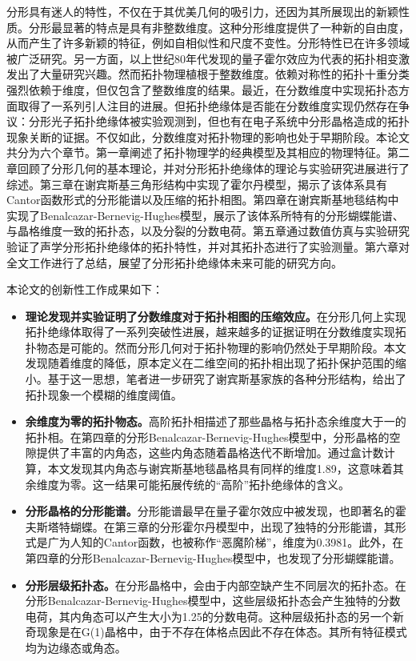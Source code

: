 \cleardoublepage
{}
分形具有迷人的特性，不仅在于其优美几何的吸引力，还因为其所展现出的新颖性质。分形最显著的特点是具有非整数维度。这种分形维度提供了一种新的自由度，从而产生了许多新颖的特征，例如自相似性和尺度不变性。分形特性已在许多领域被广泛研究。另一方面，以上世纪80年代发现的量子霍尔效应为代表的拓扑相变激发出了大量研究兴趣。然而拓扑物理植根于整数维度。依赖对称性的拓扑十重分类强烈依赖于维度，但仅包含了整数维度的结果。最近，在分数维度中实现拓扑态方面取得了一系列引人注目的进展。但拓扑绝缘体是否能在分数维度实现仍然存在争议：分形光子拓扑绝缘体被实验观测到，但也有在电子系统中分形晶格造成的拓扑现象关断的证据。不仅如此，分数维度对拓扑物理的影响也处于早期阶段。本论文共分为六个章节。第一章阐述了拓扑物理学的经典模型及其相应的物理特征。第二章回顾了分形几何的基本理论，并对分形拓扑绝缘体的理论与实验研究进展进行了综述。第三章在谢宾斯基三角形结构中实现了霍尔丹模型，揭示了该体系具有Cantor函数形式的分形能谱以及压缩的拓扑相图。第四章在谢宾斯基地毯结构中实现了Benalcazar-Bernevig-Hughes模型，展示了该体系所特有的分形蝴蝶能谱、与晶格维度一致的拓扑态，以及分裂的分数电荷。第五章通过数值仿真与实验研究验证了声学分形拓扑绝缘体的拓扑特性，并对其拓扑态进行了实验测量。第六章对全文工作进行了总结，展望了分形拓扑绝缘体未来可能的研究方向。

本论文的创新性工作成果如下：
\begin{itemize}
    \item \textbf{理论发现并实验证明了分数维度对于拓扑相图的压缩效应。}在分形几何上实现拓扑绝缘体取得了一系列突破性进展，越来越多的证据证明在分数维度实现拓扑物态是可能的。然而分形几何对于拓扑物理的影响仍然处于早期阶段。本文发现随着维度的降低，原本定义在二维空间的拓扑相出现了拓扑保护范围的缩小。基于这一思想，笔者进一步研究了谢宾斯基家族的各种分形结构，给出了拓扑现象一个模糊的维度阈值。
    \item \textbf{余维度为零的拓扑物态。}高阶拓扑相描述了那些晶格与拓扑态余维度大于一的拓扑相。在第四章的分形Benalcazar-Bernevig-Hughes模型中，分形晶格的空隙提供了丰富的内角态，这些内角态随着晶格迭代不断增加。通过盒计数计算，本文发现其内角态与谢宾斯基地毯晶格具有同样的维度1.89，这意味着其余维度为零。这一结果可能拓展传统的“高阶”拓扑绝缘体的含义。
    \item \textbf{分形晶格的分形能谱。}分形能谱最早在量子霍尔效应中被发现，也即著名的霍夫斯塔特蝴蝶。在第三章的分形霍尔丹模型中，出现了独特的分形能谱，其形式是广为人知的Cantor函数，也被称作“恶魔阶梯”，维度为0.3981。此外，在第四章的分形Benalcazar-Bernevig-Hughes模型中，也发现了分形蝴蝶能谱。
    \item \textbf{分形层级拓扑态。}在分形晶格中，会由于内部空缺产生不同层次的拓扑态。在分形Benalcazar-Bernevig-Hughes模型中，这些层级拓扑态会产生独特的分数电荷，其内角态可以产生大小为1.25的分数电荷。这种层级拓扑态的另一个新奇现象是在G(1)晶格中，由于不存在体格点因此不存在体态。其所有特征模式均为边缘态或角态。
\end{itemize}



